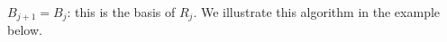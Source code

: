 \documentclass[3p]{elsarticle}
\newcommand{\fL}{\mathcal{L}}    %
\newcommand{\transp}{{}^{\mathrm{t}}}  %
\newcommand{\kernel}{\mathrm{ker}} %
\newcommand{\lwa}{{\sc lwa}}           %
\newcommand{\Span}{\mathrm{span}}  %
\begin{document}
$B_{j+1}=B_j$: this is the basis of $R_j$.
We illustrate this algorithm in the example below.
\end{document}
